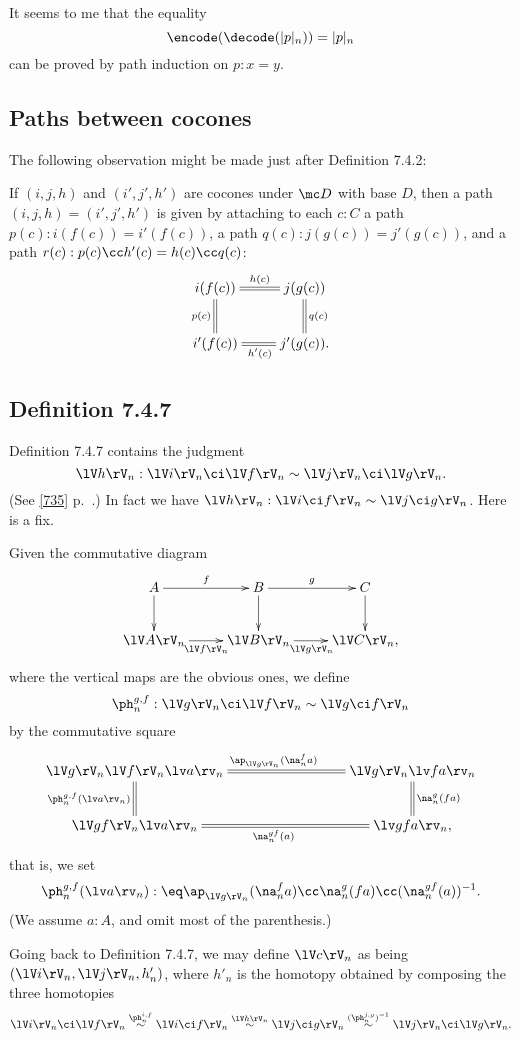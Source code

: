 \documentclass[12pt]{article}
\begin{document}
It seems to me that the equality 
$$
\encode(\decode(\lvert p\rvert_n))=\lvert p\rvert_n
$$ 
can be proved by path induction on $p:x=y$.


\subsection{Paths between cocones}\label{742}

The following observation might be made just after Definition 7.4.2: 

If $(i,j,h)$ and $(i',j',h')$ are cocones under $\mc D$ with base $D$, then a path $(i,j,h)=(i',j',h')$ is given by attaching to each $c:C$ a path $p(c):i(f(c))=i'(f(c))$, a path $q(c):j(g(c))=j'(g(c))$, and a path $r(c):p(c)\cc h'(c)=h(c)\cc q(c)$: 
$$
\xymatrix{
i(f(c))\ar@{=}[r]^{h(c)}\ar@{=}[d]_{p(c)}&j(g(c))\ar@{=}[d]^{q(c)}\\ 
i'(f(c))\ar@{=}[r]_{h'(c)}&j'(g(c)).}
$$


\subsection{Definition 7.4.7}\label{747}

Definition 7.4.7 contains the judgment 
$$
\lV h\rV_n:\lV i\rV_n\ci\lV f\rV_n\sim\lV j\rV_n\ci\lV g\rV_n.
$$ 
(See \eqref{735} p.~\pageref{735}.) In fact we have $\lV h\rV_n:\lV i\ci f\rV_n\sim\lV j\ci g\rV_n$. Here is a fix. 

Given the commutative diagram
$$
\xymatrix{
A\ar[r]^f\ar[d]&B\ar[r]^g\ar[d]&C\ar[d]\\
\lV A\rV_n\ar[r]_{\lV f\rV_n}&\lV B\rV_n\ar[r]_{\lV g\rV_n}&\lV C\rV_n,}
$$ 
where the vertical maps are the obvious ones, we define 
$$
\ph_n^{g,f}:\lV g\rV_n\ci\lV f\rV_n\sim\lV g\ci f\rV_n
$$ 
by the commutative square 
$$
\xymatrix{
\lV g\rV_n\lV f\rV_n\lv a\rv_n\ar@{=}[d]_{\ph_n^{g,f}(\lv a\rv_n)}\ar@{=}[rrr]^{\ap_{\lV g\rV_n}(\na_n^fa)}&&&
\lV g\rV_n\lv fa\rv_n\ar@{=}[d]^{\na_n^g(fa)}\\
\lV gf\rV_n\lv a\rv_n\ar@{=}[rrr]_{\na_n^{gf}(a)}&&&\lv gfa\rv_n,}
$$ 
that is, we set 
$$
\ph_n^{g,f}(\lv a\rv_n):\eq\ap_{\lV g\rV_n}(\na_n^fa)\cc\na_n^g(fa)\cc(\na_n^{gf}(a))^{-1}.
$$ 
(We assume $a:A$, and omit most of the parenthesis.)

Going back to Definition 7.4.7, we may define $\lV c\rV_n$ as being $(\lV i\rV_n,\lV j\rV_n,h'_n)$, where $h'_n$ is the homotopy obtained by composing the three homotopies
$$
\lV i\rV_n\ci\lV f\rV_n\overset{\ph_n^{i,f}}{\sim}\lV i\ci f\rV_n\overset{\lV h\rV_n}{\sim}\lV j\ci g\rV_n\overset{(\ph_n^{j,g})^{-1}}{\sim}\lV j\rV_n\ci\lV g\rV_n.
$$
\end{document}
